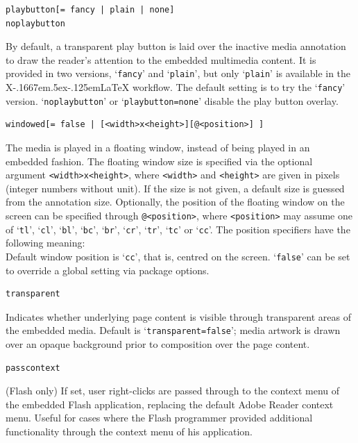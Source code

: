\documentclass[a4paper]{article}
\def\XeLaTeX{X\kern-.1667em\lower.5ex\hbox{\reflectbox{E}}\kern-.125em\LaTeX}
\begin{document}
\begin{verbatim}
playbutton[= fancy | plain | none]
noplaybutton
\end{verbatim}
By default, a transparent play button is laid over the inactive media annotation to draw the reader's attention to the embedded multimedia content. It is provided in two versions, `\verb+fancy+' and `\verb+plain+', but only `\verb+plain+' is available in the \XeLaTeX{} workflow. The default setting is to try the `\verb+fancy+' version. `\verb+noplaybutton+' or `\verb+playbutton=none+' disable the play button overlay.
\begin{verbatim}
windowed[= false | [<width>x<height>][@<position>] ]
\end{verbatim}
The media is played in a floating window, instead of being played in an embedded fashion. The floating window size is specified via the optional argument \verb+<width>x<height>+, where \verb+<width>+ and \verb+<height>+ are given in pixels (integer numbers without unit). If the size is not given, a default size is guessed from the annotation size. Optionally, the position of the floating window on the screen can be specified through \verb+@<position>+, where \verb+<position>+ may assume one of `\verb+tl+', `\verb+cl+', `\verb+bl+', `\verb+bc+', `\verb+br+', `\verb+cr+', `\verb+tr+', `\verb+tc+' or `\verb+cc+'. The position specifiers have the following meaning:\\[0.5ex]
Default window position is `\verb+cc+', that is, centred on the screen. `\verb+false+' can be set to override a global setting via package options.
\begin{verbatim}
transparent
\end{verbatim}
Indicates whether underlying page content is visible through transparent areas of the embedded media. Default is `\verb+transparent=false+'; media artwork is drawn over an opaque background prior to composition over the page content.
\begin{verbatim}
passcontext
\end{verbatim}
(Flash only) If set, user right-clicks are passed through to the context menu of the embedded Flash application, replacing the default Adobe Reader context menu. Useful for cases where the Flash programmer provided additional functionality through the context menu of his application.
\end{document}
